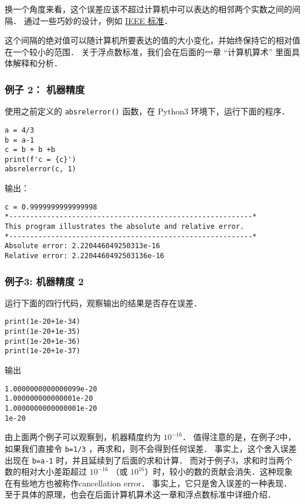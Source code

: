 换一个角度来看，这个误差应该不超过计算机中可以表达的相邻两个实数之间的间隔． 通过一些巧妙的设计，例如 \href{https://ieeexplore.ieee.org/document/8766229}{IEEE 标准}．

这个间隔的绝对值可以随计算机所要表达的值的大小变化，并始终保持它的相对值在一个较小的范围． 关于浮点数标准，我们会在后面的一章 “计算机算术” 里面具体解释和分析．

\subsubsection{例子 2： 机器精度}

使用之前定义的 \verb|absrelerror()| 函数，在 Python3 环境下，运行下面的程序．
\begin{lstlisting}[language={}]
a = 4/3
b = a-1
c = b + b +b
print(f'c = {c}')
absrelerror(c, 1)
\end{lstlisting}

输出：
\begin{lstlisting}[language={}]
c = 0.9999999999999998
*----------------------------------------------------------*
This program illustrates the absolute and relative error.
*----------------------------------------------------------*
Absolute error: 2.220446049250313e-16
Relative error: 2.2204460492503136e-16
\end{lstlisting}

\subsubsection{例子3: 机器精度 2}
运行下面的四行代码，观察输出的结果是否存在误差．
\begin{lstlisting}[language={}]
print(1e-20+1e-34)
print(1e-20+1e-35)
print(1e-20+1e-36)
print(1e-20+1e-37)
\end{lstlisting}
输出
\begin{lstlisting}[language={}]
1.0000000000000099e-20
1.000000000000001e-20
1.0000000000000001e-20
1e-20
\end{lstlisting}

由上面两个例子可以观察到，机器精度约为  $10^{-16}$． 值得注意的是，在例子2中， 如果我们直接令 \verb|b=1/3| ，再求和，则不会得到任何误差． 事实上，这个舍入误差出现在 \verb|b=a-1| 时，并且延续到了后面的求和计算． 而对于例子3，求和时当两个数的相对大小差距超过  $10^{-16}$  （或  $10^{16}$）时，较小的数的贡献会消失．这种现象在有些地方也被称作cancellation error． 事实上，它只是舍入误差的一种表现． 至于具体的原理，也会在后面计算机算术这一章和浮点数标准中详细介绍．


